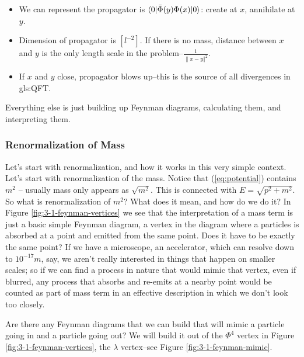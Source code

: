 \documentclass[]{article}
\begin{document}
\begin{itemize}
	\item We can represent the propagator is  $\braket{0|\bar{\Phi}(y)\Phi(x)|0}$: create at $x$, annihilate at $y$.
	\item Dimension of propagator is $[l^{-2}]$. If there is no mass, distance between $x$ and $y$ is the only length scale in the problem--$\frac{1}{\lVert x-y \Vert^2}$. 
	\item If $x$ and $y$ close, propagator blows up--this is the source of all divergences in \gls{gls:QFT}.
\end{itemize}

Everything else is just building up Feynman diagrams, calculating them, and interpreting them.

\subsubsection{Renormalization of Mass}

Let's start with renormalization, and how it works in this very simple context.
Let's start with renormalization of the mass. Notice that (\ref{eq:potential}) contains $m^2$ -- usually mass only appears as $\sqrt{m^2}$. This is connected with $E=\sqrt{p^2 + m^2}$. So what is renormalization of $m^2$? What does it mean, and how do we do it? In Figure \ref{fig:3-1-feynman-vertices} we see that the interpretation of a mass term is just a basic simple Feynman diagram, a vertex in the diagram where a particles is absorbed at a point and emitted from the same point. Does it have to be exactly the same point? If we have a microscope, an accelerator, which can resolve down to $10^{-17}m$, say, we aren't really interested in things that happen on smaller scales; so if we can find a process in nature that would mimic that vertex,  even if blurred, any process that absorbs and re-emits at a nearby point would be counted as part of mass term in an effective description in which we don't look too closely.

Are there any Feynman diagrams that we can build that will mimic a particle going in and a particle going out? We will build it out of the $\Phi^4$ vertex in Figure \ref{fig:3-1-feynman-vertices}, the $\lambda$ vertex--see Figure \ref{fig:3-1-feynman-mimic}.
\end{document}
